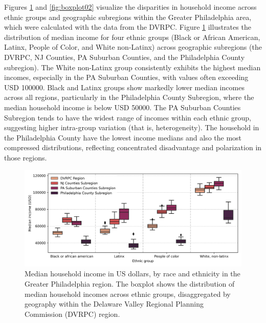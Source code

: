\documentclass[11pt]{article}
\begin{document}
Figures \ref{fig:boxplot01} and \ref{fig:boxplot02} visualize the disparities in household income across ethnic groups and geographic subregions within the Greater Philadelphia area, which were calculated with the data from the DVRPC. Figure \ref{fig:boxplot01} illustrates the distribution of median income for four ethnic groups (Black or African American, Latinx, People of Color, and White non-Latinx) across geographic subregions (the DVRPC, NJ Counties, PA Suburban Counties, and the Philadelphia County subregion). The White non-Latinx group consistently exhibits the highest median incomes, especially in the PA Suburban Counties, with values often exceeding USD 100000. Black and Latinx groups show markedly lower median incomes across all regions, particularly in the Philadelphia County Subregion, where the median household income is below USD 50000. The PA Suburban Counties Subregion tends to have the widest range of incomes within each ethnic group, suggesting higher intra-group variation (that is, heterogeneity). The household in the Philadelphia County have the lowest income medians and also the most compressed distributions, reflecting concentrated disadvantage and polarization in those regions.

\begin{figure}[ht!]
    \centering
    \includegraphics[width=\linewidth]{figures/figbp_01.png}
    \caption{Median household income in US dollars, by race and ethnicity in the Greater Philadelphia region. The boxplot shows the distribution of median household incomes across ethnic groups, disaggregated by geography within the Delaware Valley Regional Planning Commission (DVRPC) region.}
    \label{fig:boxplot01}
\end{figure}
\end{document}
